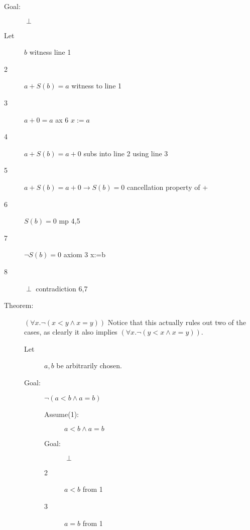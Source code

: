 \documentclass[12pt]{article}
\begin{document}
\begin{description}
\begin{description}
\begin{description}
\begin{description}
\item[Goal:]  $\perp$

\item[Let] $b$ witness line 1

\item[2] $a+S(b)=a$  witness to line 1

\item[3] $a+0=a$  ax 6 $x:=a$

\item[4]  $a+S(b)=a+0$  subs into line 2 using line 3

\item[5]  $a+S(b)=a+0\rightarrow S(b)=0$  cancellation property of +

\item[6]  $S(b)=0$ mp 4,5

\item[7] $\neg S(b)=0$  axiom 3 x:=b

\item[8]  $\perp$  contradiction 6,7

\end{description}

\end{description}

\end{description}






\begin{description}

\item[Theorem:]  $(\forall x.\neg(x<y \wedge x=y))$  Notice that this actually rules out two of the cases, as clearly it also implies $(\forall x.\neg(y<x \wedge x=y))$.

\begin{description}

\item[Let]  $a,b$ be arbitrarily chosen.

\item[Goal:]  $\neg(a<b \wedge a=b)$

\begin{description}

\item[Assume(1):]  $a<b \wedge a=b$

\item[Goal:]  $\perp$

\item[2]  $a<b$  from 1

\item[3] $a=b$  from 1


\end{description}
\end{description}
\end{description}
\end{description}
\end{document}
